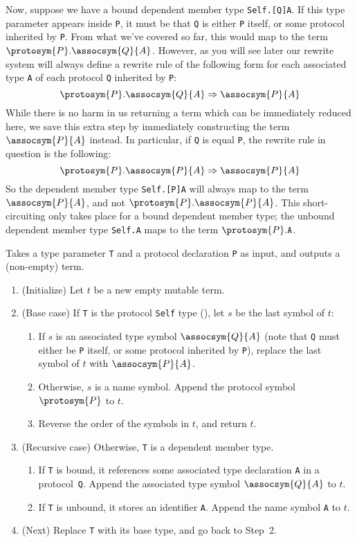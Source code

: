 \documentclass[../generics]{subfiles}
\begin{document}
%
Now, suppose we have a bound dependent member type \texttt{Self.[Q]A}. If this type parameter appears inside \texttt{P}, it must be that \texttt{Q} is either \texttt{P} itself, or some protocol inherited by \texttt{P}. From what we've covered so far, this would map to the term $\protosym{P}.\assocsym{Q}{A}$. However, as you will see later our rewrite system will always define a rewrite rule of the following form for each associated type \texttt{A} of each protocol \texttt{Q} inherited by \texttt{P}:
\[\protosym{P}.\assocsym{Q}{A}\Rightarrow \assocsym{P}{A}\]
While there is no harm in us returning a term which can be immediately reduced here, we save this extra step by immediately constructing the term $\assocsym{P}{A}$ instead. In particular, if \texttt{Q} is equal \texttt{P}, the rewrite rule in question is the following:
\[\protosym{P}.\assocsym{P}{A}\Rightarrow \assocsym{P}{A}\]
So the dependent member type \texttt{Self.[P]A} will always map to the term $\assocsym{P}{A}$, and not $\protosym{P}.\assocsym{P}{A}$. This short-circuiting only takes place for a bound dependent member type; the unbound dependent member type \texttt{Self.A} maps to the term $\protosym{P}.\texttt{A}$.

\begin{algorithm}\label{build term protocol}
Takes a type parameter \texttt{T} and a protocol declaration \texttt{P} as input, and outputs a (non-empty) term.
\begin{enumerate}
\item (Initialize) Let $t$ be a new empty mutable term.
\item (Base case) If \texttt{T} is the protocol \texttt{Self} type (), let $s$ be the last symbol of $t$:
\begin{enumerate}
\item If $s$ is an associated type symbol $\assocsym{Q}{A}$ (note that \texttt{Q} must either be \texttt{P} itself, or some protocol inherited by \texttt{P}), replace the last symbol of $t$ with $\assocsym{P}{A}$.
\item Otherwise, $s$ is a name symbol. Append the protocol symbol $\protosym{P}$ to $t$.
\item Reverse the order of the symbols in $t$, and return $t$.
\end{enumerate}
\item (Recursive case) Otherwise, \texttt{T} is a dependent member type.
\begin{enumerate}
\item If \texttt{T} is bound, it references some associated type declaration \texttt{A} in a protocol~\texttt{Q}. Append the associated type symbol $\assocsym{Q}{A}$ to $t$.
\item If \texttt{T} is unbound, it stores an identifier \texttt{A}. Append the name symbol \texttt{A} to $t$.
\end{enumerate}
\item (Next) Replace \texttt{T} with its base type, and go back to Step~2.
\end{enumerate}
\end{algorithm}
\end{document}
